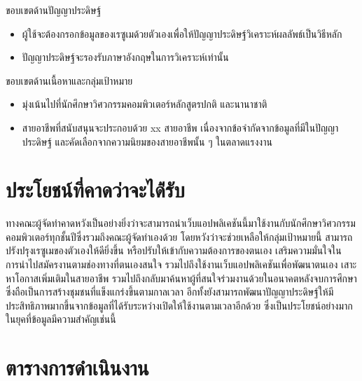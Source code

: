 ขอบเขตด้านปัญญาประดิษฐ์
\begin{itemize}
    \item  ผู้ใช้จะต้องกรอกข้อมูลของเรซูเมด้วยตัวเองเพื่อให้ปัญญาประดิษฐ์วิเคราะห์ผลลัพธ์เป็นวิธีหลัก
    \item  ปัญญาประดิษฐ์จะรองรับภาษาอังกฤษในการวิเคราะห์เท่านั้น
\end{itemize}

ขอบเขตด้านเนื้อหาและกลุ่มเป้าหมาย
\begin{itemize}
    \item  มุ่งเน้นไปที่นักศึกษาวิศวกรรมคอมพิวเตอร์หลักสูตรปกติ และนานาชาติ
    \item  สายอาชีพที่สนับสนุนจะประกอบด้วย xx สายอาชีพ เนื่องจากข้อจำกัดจากข้อมูลที่มีในปัญญาประดิษฐ์ และคัดเลือกจากความนิยมของสายอาชีพนั้น ๆ ในตลาดแรงงาน
\end{itemize}

\section{ประโยชน์ที่คาดว่าจะได้่รับ}

ทางคณะผู้จัดทำคาดหวังเป็นอย่างยิ่งว่าจะสามารถนำเว็บแอปพลิเคชันนี้มาใช้งานกับนักศึกษาวิศวกรรมคอมพิวเตอร์ทุกชั้นปีซึ่งรวมถึงคณะผู้จัดทำเองด้วย โดยหวังว่าจะช่วยเหลือให้กลุ่มเป้าหมายนี้ สามารถปรังปรุงเรซูเมของตัวเองให้ดียิ่งขึ้น หรือปรับให้เข้ากับความต้องการของตนเอง เสริมความมั่นใจในการนำไปสมัครงานตามช่องทางที่ตนเองสนใจ รวมไปถึงใช้งานเว็บแอปพลิเคชันเพื่อพัฒนาตนเอง เสาะหาโอกาสเพิ่มเติมในสายอาชีพ รวมไปถึงกลับมาค้นหาผู้ที่สนใจร่วมงานด้วยในอนาคตหลังจบการศึกษา ซึ่งถือเป็นการสร้างชุมชนที่แข็งแกร่งขึ้นตามกาลเวลา อีกทั้งยังสามารถพัฒนาปัญญาประดิษฐ์ให้มีประสิทธิภาพมากขึ้นจากข้อมูลที่ได้รับระหว่างเปิดให้ใช้งานตามเวลาอีกด้วย ซึ่งเป็นประโยชน์อย่างมากในยุคที่ข้อมูลมีความสำคัญเช่นนี้

\section{ตารางการดำเนินงาน}